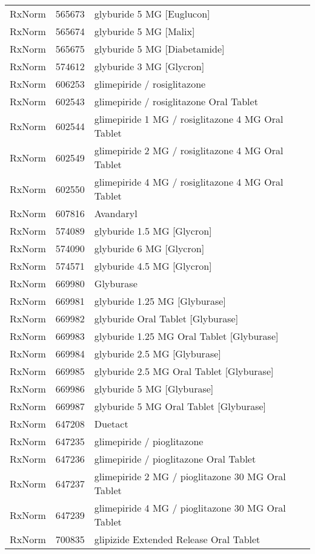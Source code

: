 \begin{longtable}{p{}p{}p{}}
  RxNorm & 565673 & glyburide 5 MG [Euglucon] \\ 
  RxNorm & 565674 & glyburide 5 MG [Malix] \\ 
  RxNorm & 565675 & glyburide 5 MG [Diabetamide] \\ 
  RxNorm & 574612 & glyburide 3 MG [Glycron] \\ 
  RxNorm & 606253 & glimepiride / rosiglitazone \\ 
  RxNorm & 602543 & glimepiride / rosiglitazone Oral Tablet \\ 
  RxNorm & 602544 & glimepiride 1 MG / rosiglitazone 4 MG Oral Tablet \\ 
  RxNorm & 602549 & glimepiride 2 MG / rosiglitazone 4 MG Oral Tablet \\ 
  RxNorm & 602550 & glimepiride 4 MG / rosiglitazone 4 MG Oral Tablet \\ 
  RxNorm & 607816 & Avandaryl \\ 
  RxNorm & 574089 & glyburide 1.5 MG [Glycron] \\ 
  RxNorm & 574090 & glyburide 6 MG [Glycron] \\ 
  RxNorm & 574571 & glyburide 4.5 MG [Glycron] \\ 
  RxNorm & 669980 & Glyburase \\ 
  RxNorm & 669981 & glyburide 1.25 MG [Glyburase] \\ 
  RxNorm & 669982 & glyburide Oral Tablet [Glyburase] \\ 
  RxNorm & 669983 & glyburide 1.25 MG Oral Tablet [Glyburase] \\ 
  RxNorm & 669984 & glyburide 2.5 MG [Glyburase] \\ 
  RxNorm & 669985 & glyburide 2.5 MG Oral Tablet [Glyburase] \\ 
  RxNorm & 669986 & glyburide 5 MG [Glyburase] \\ 
  RxNorm & 669987 & glyburide 5 MG Oral Tablet [Glyburase] \\ 
  RxNorm & 647208 & Duetact \\ 
  RxNorm & 647235 & glimepiride / pioglitazone \\ 
  RxNorm & 647236 & glimepiride / pioglitazone Oral Tablet \\ 
  RxNorm & 647237 & glimepiride 2 MG / pioglitazone 30 MG Oral Tablet \\ 
  RxNorm & 647239 & glimepiride 4 MG / pioglitazone 30 MG Oral Tablet \\ 
  RxNorm & 700835 & glipizide Extended Release Oral Tablet \\ 

\end{longtable}
